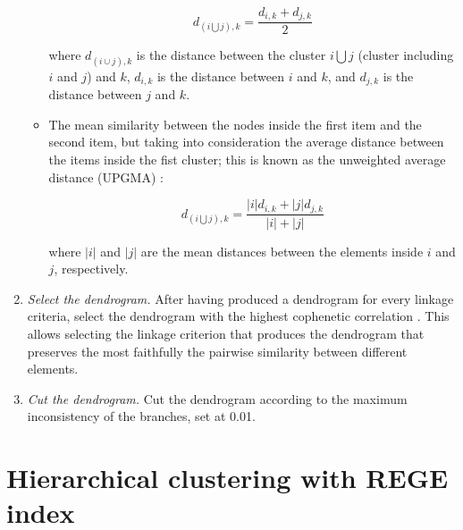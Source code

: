 \documentclass[twocolumn]{article}
\begin{document}
\begin{appendices}
\begin{enumerate}
\begin{itemize}
				            	\begin{equation}
					            	d_{(i \bigcup j),k}=\frac{d_{i,k}+d_{j,k}}{2} \label{eqn:WPGMA}
				            	\end{equation}

											\noindent where $d_{\left(i\cup j\right),k}$ is the distance between the cluster $i \bigcup j$ (cluster including $i$ and $j$) and $k$, $d_{i,k}$ is the distance between $i$ and $k$, and  $d_{j,k}$ is the distance between $j$ and $k$.
				      \item	The mean similarity between the nodes inside the first item and the second item, but taking into consideration the average distance between the items inside the fist cluster; this is known as the unweighted average distance (UPGMA) \citep{Sokal1958}:

				            	\begin{equation}
					            	d_{(i \bigcup j),k}=\frac{|i|d_{i,k}+|j|d_{j,k}}{|i|+|j|} \label{eqn:UPGMA}
				            	\end{equation}

							\noindent where $|i|$ and $|j|$ are the mean distances between the elements inside $i$ and $j$, respectively.
			      \end{itemize}

			\item \emph{Select the dendrogram.} \smallskip \newline
						After having produced a dendrogram for every linkage criteria, select the dendrogram with the highest cophenetic correlation \citep{Sokal1962}.
			      This allows selecting the linkage criterion that produces the dendrogram that preserves the most faithfully the pairwise similarity between different elements.

			\item \emph{Cut the dendrogram.} \smallskip \newline
			      Cut the dendrogram according to the maximum inconsistency of the branches, set at 0.01.

		\end{enumerate}

	\section{Hierarchical clustering with REGE index} \label{appendix:rege}

		\begin{enumerate}


\end{enumerate}
\end{appendices}
\end{document}
